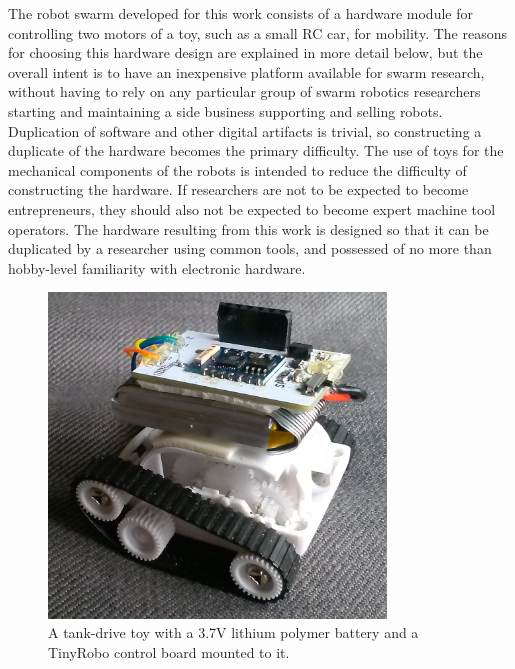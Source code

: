 \documentclass[]{article}
\begin{document}
The robot swarm developed for this work consists of a hardware module for controlling two motors of a toy, such as a small RC car, for mobility. 
The reasons for choosing this hardware design are explained in more detail below, but the overall intent is to have an inexpensive platform available for swarm research, without having to rely on any particular group of swarm robotics researchers starting and maintaining a side business supporting and selling robots.
Duplication of software and other digital artifacts is trivial, so constructing a duplicate of the hardware becomes the primary difficulty. 
The use of toys for the mechanical components of the robots is intended to reduce the difficulty of constructing the hardware. 
If researchers are not to be expected to become entrepreneurs, they should also not be expected to become expert machine tool operators.
The hardware resulting from this work is designed so that it can be duplicated by a researcher using common tools, and possessed of no more than hobby-level familiarity with electronic hardware.

\begin{figure}
\centering
\includegraphics[width=0.8\textwidth]{../robot_makers_2/tiny_tank}
\caption{A tank-drive toy with a 3.7V lithium polymer battery and a TinyRobo control board mounted to it.}
\end{figure}
\end{document}
